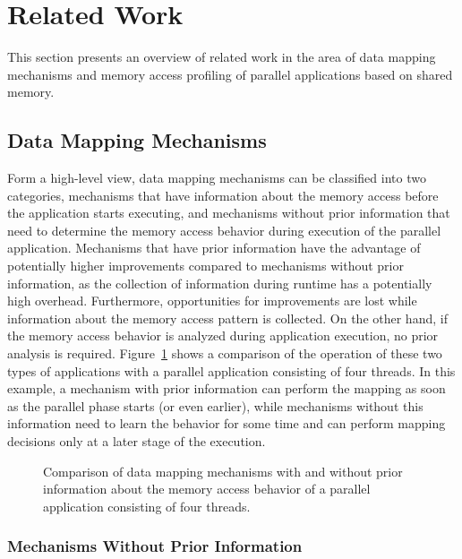 
\section{Related Work}
\label{sec:soa}

This section presents an overview of related work in the area of data mapping mechanisms and memory access profiling of parallel applications based on shared memory.

\subsection{Data Mapping Mechanisms}
\label{sec:soa-mapping}

Form a high-level view, data mapping mechanisms can be classified into two categories, mechanisms that have information about the memory access before the application starts executing, and mechanisms without prior information that need to determine the memory access behavior during execution of the parallel application.
Mechanisms that have prior information have the advantage of potentially higher improvements compared to mechanisms without prior information, as the collection of information during runtime has a potentially high overhead.
Furthermore, opportunities for improvements are lost while information about the memory access pattern is collected.
On the other hand, if the memory access behavior is analyzed during application execution, no prior analysis is required.
Figure~\ref{fig:timeline} shows a comparison of the operation of these two types of applications with a parallel application consisting of four threads.
In this example, a mechanism with prior information can perform the mapping as soon as the parallel phase starts (or even earlier), while mechanisms without this information need to learn the behavior for some time and can perform mapping decisions only at a later stage of the execution.

\begin{figure}[!b]
    
    \caption{Comparison of data mapping mechanisms with and without prior information about the memory access behavior of a parallel application consisting of four threads.}
    \label{fig:timeline}
\end{figure}

\subsubsection{Mechanisms Without Prior Information}

